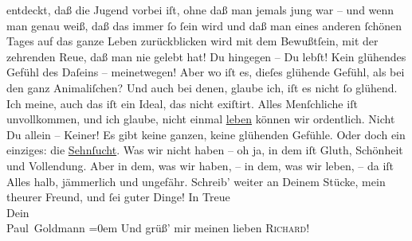 \begin{ledgroupsized}[t]{13cm}
                   entdeckt, daß die Jugend vorbei iſt, ohne daß
               man jemals jung war – und wenn man genau weiß, daß das immer ſo ſein wird und daß man
               eines  anderen ſchönen Tages auf das {\pb}ganze Leben zurückblicken wird mit dem Bewußtſein,
               mit der zehrenden Reue, daß man nie gelebt hat! Du hingegen – Du lebſt! Kein
               glühendes Gefühl des Daſeins – meinetwegen! Aber wo iſt es, dieſes glühende Gefühl,
               als bei den ganz Animaliſchen? Und auch bei denen, glaube ich, iſt es nicht ſo
               glühend. Ich meine, auch das iſt ein Ideal, das nicht exiſtirt. Alles Menſchliche iſt
                   unvollkommen, und ich glaube, nicht einmal {\pb}\uline{leben} können wir ordentlich. Nicht Du allein –
               Keiner! Es gibt keine ganzen, keine glühenden Gefühle. Oder doch\strikeout{,} ein einziges: die \uline{Sehnſucht}. Was wir nicht haben – oh ja, in dem iſt Gluth, Schönheit und
               Vollendung. Aber in dem, was wir haben, – in dem, was wir leben, – da iſt Alles halb,
               jämmerlich und ungefähr.\pend
           \pstart
           {\pb}Schreib’ weiter an Deinem Stücke, mein theurer Freund,
               und ſei guter Dinge!\pend
           \pstart
           In Treue {\\[\baselineskip]}Dein {\\[\baselineskip]}\spacefill\mbox{Paul Goldmann}\pend
           \leftskip=0em{}\pstart
           \noindent{}Und grüß’ mir meinen lieben \textsc{Richard}!\pend
           
         
         \endnumbering{}\end{ledgroupsized}  \newcommand{\dateiname}{L02765}\newcommand{\titel}{Paul Goldmann an Arthur Schnitzler, 23. 1. [1896]}\newcommand{\editorInnen}{Martin Anton Müller und Laura Untner}
      